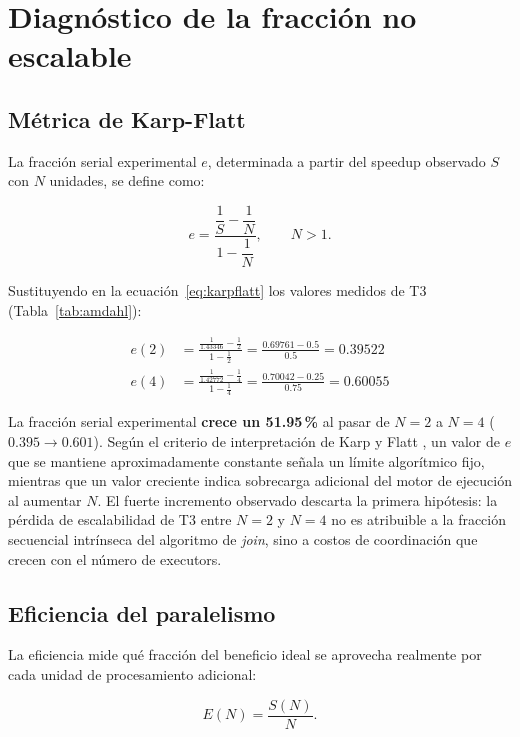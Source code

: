 \documentclass[11pt]{article}
\begin{document}
\section{Diagnóstico de la fracción no escalable}


\subsection{Métrica de Karp-Flatt}

La fracción serial experimental $e$, determinada a partir del speedup
observado $S$ con $N$ unidades, se define como:

\begin{equation}
e = \frac{\dfrac{1}{S} - \dfrac{1}{N}}{1 - \dfrac{1}{N}}, \qquad N > 1.
\label{eq:karpflatt}
\end{equation}

Sustituyendo en la ecuación~\eqref{eq:karpflatt} los valores medidos de
T3 (Tabla~\ref{tab:amdahl}):

\begin{align}
e(2) &= \frac{\frac{1}{1.43346} - \frac{1}{2}}{1 - \frac{1}{2}}
      = \frac{0.69761 - 0.5}{0.5} = 0.39522 \\
e(4) &= \frac{\frac{1}{1.42772} - \frac{1}{4}}{1 - \frac{1}{4}}
      = \frac{0.70042 - 0.25}{0.75} = 0.60055
\end{align}

La fracción serial experimental \textbf{crece un 51.95\,\%} al pasar de
$N=2$ a $N=4$ ($0.395\rightarrow0.601$). Según el criterio de
interpretación de Karp y Flatt \cite{karpflatt1990}, un valor de $e$
que se mantiene aproximadamente constante señala un límite algorítmico
fijo, mientras que un valor creciente indica sobrecarga adicional del
motor de ejecución al aumentar $N$. El fuerte incremento observado
descarta la primera hipótesis: la pérdida de escalabilidad de T3 entre
$N=2$ y $N=4$ no es atribuible a la fracción secuencial intrínseca del
algoritmo de \emph{join}, sino a costos de coordinación que crecen con
el número de executors.

\subsection{Eficiencia del paralelismo}

La eficiencia mide qué fracción del beneficio ideal se aprovecha
realmente por cada unidad de procesamiento adicional:

\begin{equation}
E(N) = \frac{S(N)}{N}.
\label{eq:eficiencia}
\end{equation}
\end{document}
